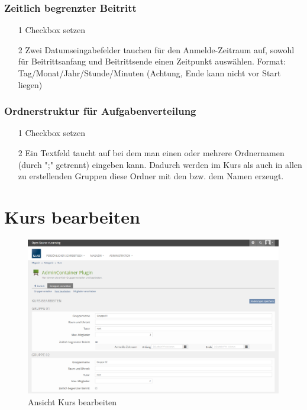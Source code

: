 \subsubsection*{Zeitlich begrenzter Beitritt}
\begin{itemize}
	\item[1] Checkbox setzen 
	\item[2] Zwei Datumseingabefelder tauchen für den Anmelde-Zeitraum auf, sowohl für Beitrittsanfang und Beitrittsende einen Zeitpunkt auswählen. Format: Tag/Monat/Jahr/Stunde/Minuten 
	(Achtung, Ende kann nicht vor Start liegen)
	
\end{itemize}

\subsubsection*{Ordnerstruktur für Aufgabenverteilung}
\begin{itemize}
	\item[1] Checkbox setzen 
	\item[2] Ein Textfeld taucht auf bei dem man einen oder mehrere Ordnernamen (durch ";" getrennt) eingeben kann. Dadurch werden im Kurs als auch in allen zu erstellenden Gruppen diese Ordner mit den bzw. dem Namen erzeugt.
	
\end{itemize}
\clearpage

\section{Kurs bearbeiten}
\begin{figure}
	\centering
	\includegraphics[width=1\textwidth]{img/kursBearbeiten.png}
	\caption{Ansicht Kurs bearbeiten}
\end{figure}


